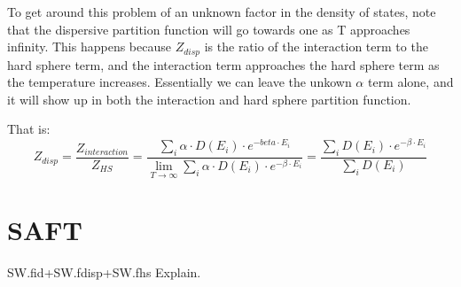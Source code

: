 To get around this problem of an unknown factor in the density of states, note that the dispersive partition function will go towards one as T approaches infinity. This happens because $Z_{disp}$ is the ratio of the interaction term to the hard sphere term, and the interaction term approaches the hard sphere term as the temperature increases. Essentially we can leave the unkown $\alpha$ term alone, and it will show up in both the interaction and hard sphere partition function.

That is: $$Z_{disp}=\frac{Z_{interaction}}{Z_{HS}}=\frac{\sum_i \alpha\cdot D(E_i)\cdot e^{-beta\cdot E_i}}{\lim_{T\to\infty}\sum_i \alpha\cdot D(E_i)\cdot e^{-\beta\cdot E_i}}=\frac{\sum_i D(E_i)\cdot e^{-\beta\cdot E_i}}{\sum_i D(E_i)}$$

\section{SAFT}
SW.fid+SW.fdisp+SW.fhs Explain.



